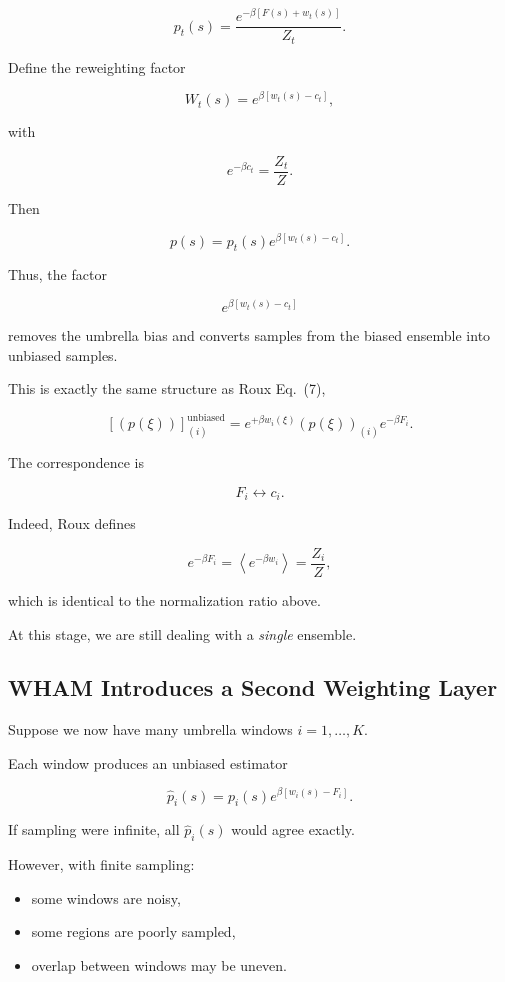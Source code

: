 \[
p_t(s)=\frac{e^{-\beta[F(s)+w_t(s)]}}{Z_t}.
\]

Define the reweighting factor

\[
W_t(s)=e^{\beta[w_t(s)-c_t]},
\]

with

\[
e^{-\beta c_t}=\frac{Z_t}{Z}.
\]

Then

\[
p(s)=p_t(s)e^{\beta[w_t(s)-c_t]}.
\]

Thus, the factor

\[
e^{\beta[w_t(s)-c_t]}
\]

removes the umbrella bias and converts samples from the biased ensemble into unbiased samples.

This is exactly the same structure as Roux Eq.~(7),

\[
[(p(\xi))]^{\mathrm{unbiased}}_{(i)}
=
e^{+\beta w_i(\xi)}
(p(\xi))_{(i)}
e^{-\beta F_i}.
\]

The correspondence is

\[
F_i \leftrightarrow c_i.
\]

Indeed, Roux defines

\[
e^{-\beta F_i}
=
\left\langle e^{-\beta w_i}\right\rangle
=
\frac{Z_i}{Z},
\]

which is identical to the normalization ratio above.

At this stage, we are still dealing with a \emph{single} ensemble.

\subsection{WHAM Introduces a Second Weighting Layer}

Suppose we now have many umbrella windows \(i=1,\dots,K\).

Each window produces an unbiased estimator

\[
\hat p_i(s)
=
p_i(s)e^{\beta[w_i(s)-F_i]}.
\]

If sampling were infinite, all \(\hat p_i(s)\) would agree exactly.

However, with finite sampling:

\begin{itemize}
    \item some windows are noisy,
    \item some regions are poorly sampled,
    \item overlap between windows may be uneven.
\end{itemize}

